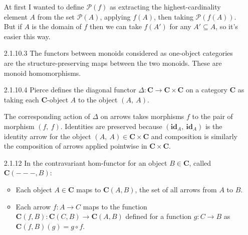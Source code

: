 \documentclass{article}
\newcommand{\diag}{\Delta}
\newcommand{\ccat}{\mathbf{C}}
\newcommand{\id}{\mathbf{id}}
\newcommand{\pow}{\mathcal{P}}
\newcommand{\fpow}{\mathbf{\mathcal{P}}}
\begin{document}
\begin{enumerate}
  At first I wanted to define $\fpow(f)$ as extracting the highest-cardinality element $A$ from the set $\pow(A)$, applying $f(A)$, then taking $\pow(f(A))$.
  But if $A$ is the domain of $f$ then we can take $f(A')$ for any $A' \subseteq A$, so it's easier this way.
\item[]
\item[2.1.10.3] The functors between monoids considered as one-object categories are the structure-preserving maps between the two monoids.
  These are monoid homomorphisms.

\item[]
\item [2.1.10.4]
  Pierce defines the diagonal functor $\diag : \ccat \rightarrow \ccat \times \ccat$ on a category $\ccat$ as taking each $\ccat$-object $A$ to the object $(A,~A)$.
  
  The corresponding action of $\diag$ on arrows takes morphisms $f$ to the pair of morphism $(f,~f)$.
  Identities are preserved because $(\id_A,~\id_A)$ is the identity arrow for the object $(A,~A) \in \ccat \times \ccat$ and composition is similarly the composition of arrows applied pointwise in $\ccat \times \ccat$.

\item[]
\item [2.1.12]
  In the contravariant hom-functor for an object $B \in \ccat$, called $\ccat(---,B)$:
  \begin{itemize}
  \item Each object $A \in \ccat$ maps to $\ccat(A,B)$, the set of all arrows from $A$ to $B$.
  \item Each arrow $f : A \rightarrow C$ maps to the function $\ccat(f, B) : \ccat(C,B) \rightarrow \ccat(A,B)$ defined for a function $g : C \rightarrow B$ as $\ccat(f,B)(g) = g \circ f$.
  \end{itemize}
 
\end{enumerate}
\end{document}
